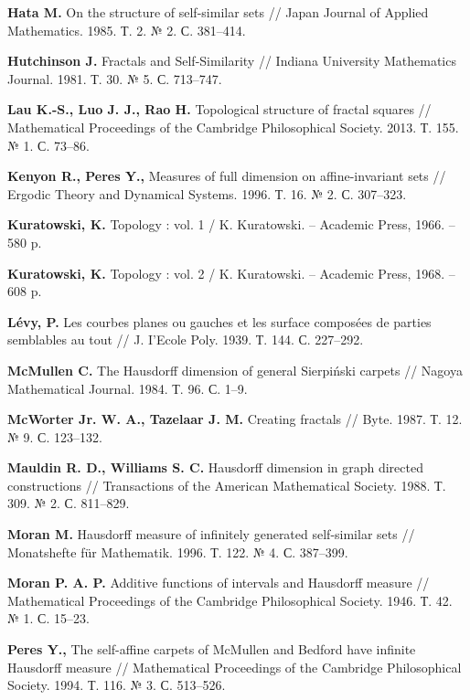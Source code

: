\begin{thebibliography}{99}
{\bf Hata M. }
On the structure of self-similar sets // 
Japan Journal of Applied Mathematics. 1985. Т. 2. № 2. С. 381–414.

{\bf Hutchinson J. }
Fractals and Self-Similarity // 
Indiana University Mathematics Journal. 1981. Т. 30. № 5. С. 713–747.

{\bf Lau K.-S., Luo J. J., Rao H. }
Topological structure of fractal squares // 
Mathematical Proceedings of the Cambridge Philosophical Society. 2013. Т. 155. № 1. С. 73--86.

{\bf Kenyon R., Peres Y.,} 
Measures of full dimension on affine-invariant sets // 
Ergodic Theory and Dynamical Systems. 1996. Т. 16. № 2. С. 307–323.

{\bf Kuratowski, K.} 
Topology : vol. 1 / 
K. Kuratowski. -- Academic Press, 1966. -- 580 p.

{\bf Kuratowski, K.} 
Topology : vol. 2 / 
K. Kuratowski. -- Academic Press, 1968. -- 608 p.

{\bf L{\'e}vy, P.} 
Les courbes planes ou gauches et les surface compos{\'e}es de parties semblables au tout // 
J. I’Ecole Poly. 1939. Т. 144. С. 227--292.

{\bf McMullen C. }
The Hausdorff dimension of general Sierpiński carpets // 
Nagoya Mathematical Journal. 1984. Т. 96. С. 1–9.

{\bf McWorter Jr. W. A., Tazelaar J. M.}
Creating fractals // 
Byte. 1987. Т. 12. № 9. С. 123--132.

{\bf Mauldin R. D., Williams S. C.}
Hausdorff dimension in graph directed constructions // 
Transactions of the American Mathematical Society. 1988. Т. 309. № 2. С. 811--829.

{\bf Moran M.}
Hausdorff measure of infinitely generated self-similar sets // 
Monatshefte für Mathematik. 1996. Т. 122. № 4. С. 387--399.

{\bf Moran P. A. P. }
Additive functions of intervals and Hausdorff measure // 
Mathematical Proceedings of the Cambridge Philosophical Society. 1946. Т. 42. № 1. С. 15–23.

{\bf Peres Y.,}
The self-affine carpets of McMullen and Bedford have infinite Hausdorff measure // 
Mathematical Proceedings of the Cambridge Philosophical Society. 1994. Т. 116. № 3. С. 513--526.


\end{thebibliography}
